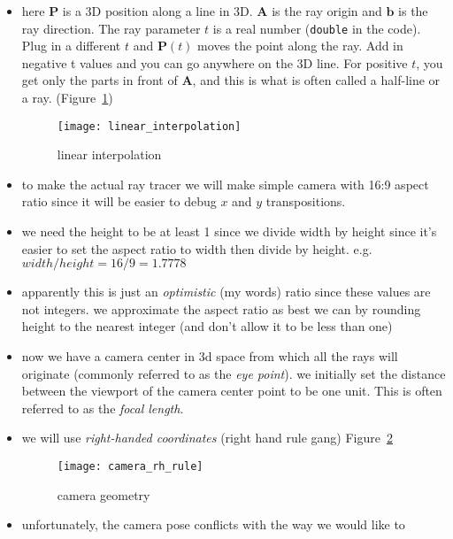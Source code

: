 \begin{itemize}
    \item here $\mathbf{P}$ is a 3D position along a line in 3D. $\mathbf{A}$ is
        the ray origin and $\mathbf{b}$ is the ray direction. The ray parameter
        $t$ is a real number (\texttt{double} in the code). Plug in a different
        $t$ and $\mathbf{P}(t)$ moves the point along the ray. Add in negative t
        values and you can go anywhere on the 3D line. For positive $t$, you get
        only the parts in front of $\mathbf{A}$, and this is what is often
        called a half-line or a ray. (Figure~\ref{fig:linear_interpolation}) 
        \begin{figure}[ht]
            \centering
            \texttt{[image: linear\_interpolation]}
            \captionsetup{labelfont=bf, textfont=it}
            \caption{linear interpolation}
            \label{fig:linear_interpolation}
        \end{figure}
    \item to make the actual ray tracer we will make simple camera with 16:9
        aspect ratio since it will be easier to debug $x$ and $y$ 
        transpositions.
    \item we need the height to be at least 1 since we divide width by height
        since it's easier to set the aspect ratio to width then divide by
        height. e.g. $width/height = 16/9 = 1.7778$
    \item apparently this is just an \textit{optimistic} (my words) ratio since 
        these values are not integers. we approximate the aspect ratio as best 
        we can by rounding height to the nearest integer (and don't allow it 
        to be less than one)
    \clearpage
    \item now we have a camera center in 3d space from which all the rays will
        originate (commonly referred to as the \textit{eye point}). we initially
        set the distance between the viewport of the camera center point to be
        one unit. This is often referred to as the \textit{focal length}.
    \item we will use \textit{right-handed coordinates} (right hand rule gang)
        Figure~\ref{fig:camera_rh_rule}
    \begin{figure}[ht]
        \centering
        \texttt{[image: camera\_rh\_rule]}
        \captionsetup{labelfont=bf, textfont=it}
        \caption{camera geometry}
        \label{fig:camera_rh_rule}
    \end{figure}
    \item unfortunately, the camera pose conflicts with the way we would like to

\end{itemize}
